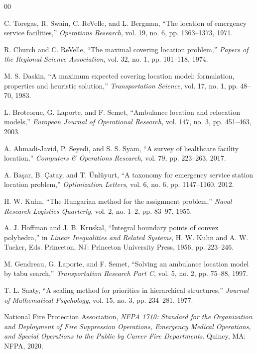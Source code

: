 \documentclass[conference]{IEEEtran}
\begin{document}
\begin{thebibliography}{00}

C. Toregas, R. Swain, C. ReVelle, and L. Bergman, ``The location of emergency
service facilities,'' \emph{Operations Research}, vol. 19, no. 6, pp.
1363--1373, 1971.

R. Church and C. ReVelle, ``The maximal covering location problem,''
\emph{Papers of the Regional Science Association}, vol. 32, no. 1, pp. 101--118,
1974.

M. S. Daskin, ``A maximum expected covering location model: formulation,
properties and heuristic solution,'' \emph{Transportation Science}, vol. 17, no.
1, pp. 48--70, 1983.

L. Brotcorne, G. Laporte, and F. Semet, ``Ambulance location and relocation
models,'' \emph{European Journal of Operational Research}, vol. 147, no. 3, pp.
451--463, 2003.

A. Ahmadi-Javid, P. Seyedi, and S. S. Syam, ``A survey of healthcare facility
location,'' \emph{Computers \& Operations Research}, vol. 79, pp. 223--263,
2017.

A. Ba\c{s}ar, B. \c{C}atay, and T. \"Unl\"uyurt, ``A taxonomy for emergency
service station location problem,'' \emph{Optimization Letters}, vol. 6, no. 6,
pp. 1147--1160, 2012.

H. W. Kuhn, ``The Hungarian method for the assignment problem,'' \emph{Naval
Research Logistics Quarterly}, vol. 2, no. 1--2, pp. 83--97, 1955.

A. J. Hoffman and J. B. Kruskal, ``Integral boundary points of convex
polyhedra,'' in \emph{Linear Inequalities and Related Systems}, H. W. Kuhn and
A. W. Tucker, Eds. Princeton, NJ: Princeton University Press, 1956, pp.
223--246.

M. Gendreau, G. Laporte, and F. Semet, ``Solving an ambulance location model by
tabu search,'' \emph{Transportation Research Part C}, vol. 5, no. 2, pp. 75--88,
1997.

T. L. Saaty, ``A scaling method for priorities in hierarchical structures,''
\emph{Journal of Mathematical Psychology}, vol. 15, no. 3, pp. 234--281, 1977.

National Fire Protection Association, \emph{NFPA 1710: Standard for the
Organization and Deployment of Fire Suppression Operations, Emergency Medical
Operations, and Special Operations to the Public by Career Fire Departments}.
Quincy, MA: NFPA, 2020.


\end{thebibliography}
\end{document}
